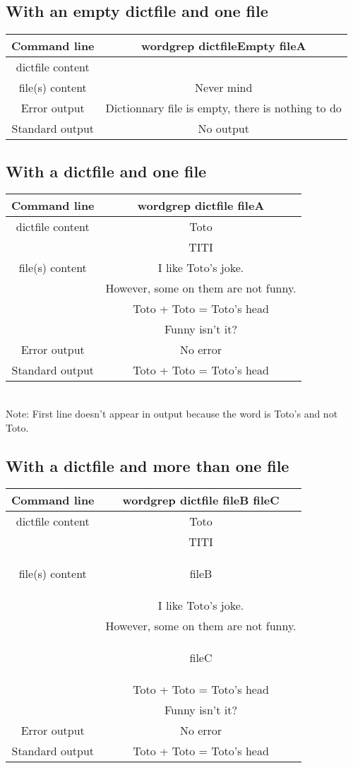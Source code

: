 \documentclass[11pt]{article} %
\begin{document}
\subsection{With an empty dictfile and one file}
\begin{tabular}{|c|c|}
\hline
Command line &
wordgrep dictfileEmpty fileA\\
\hline
dictfile content &
\\
\hline
file(s) content &
Never mind\\
\hline
Error output &
Dictionnary file is empty, there is nothing to do\\
\hline
Standard output &
No output\\
\hline
\end{tabular}

\subsection{With a dictfile and one file}
\begin{tabular}{|c|c|}
\hline
Command line &
wordgrep dictfile fileA\\
\hline
dictfile content &
Toto\\
&TITI\\
\hline
file(s) content & I like Toto's joke.\\
&However, some on them are not funny.\\
&Toto + Toto = Toto's head\\
&Funny isn't it?\\
\hline
Error output &
No error\\
\hline
Standard output &Toto + Toto = Toto's head\\
\hline
\end{tabular}
\\Note: First line doesn't appear in output because the word is Toto's and not Toto.

\subsection{With a dictfile and more than one file}
\begin{tabular}{|c|c|}
\hline
Command line &
wordgrep dictfile fileB fileC\\
\hline
dictfile content &
Toto\\
&TITI\\
\hline
file(s) content & \begin{bf}fileB\end{bf}\\
& I like Toto's joke.\\
&However, some on them are not funny.\\
& \begin{bf}fileC\end{bf}\\
&Toto + Toto = Toto's head\\
&Funny isn't it?\\
\hline
Error output &
No error\\
\hline
Standard output &Toto + Toto = Toto's head\\
\hline
\end{tabular}
\end{document}
